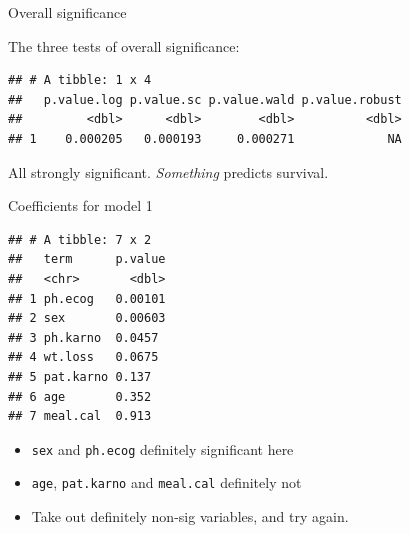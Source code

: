 \documentclass[
  ignorenonframetext,
]{beamer}
\newenvironment{Shaded}{\begin{snugshade}}{\end{snugshade}}
\newcommand{\FloatTok}[1]{\textcolor[rgb]{0.00,0.00,0.81}{#1}}
\newcommand{\KeywordTok}[1]{\textcolor[rgb]{0.13,0.29,0.53}{\textbf{#1}}}
\newcommand{\NormalTok}[1]{#1}
\newcommand{\OperatorTok}[1]{\textcolor[rgb]{0.81,0.36,0.00}{\textbf{#1}}}
\newcommand{\StringTok}[1]{\textcolor[rgb]{0.31,0.60,0.02}{#1}}
\begin{document}
\begin{frame}[fragile]{Overall significance}
\protect\hypertarget{overall-significance}{}

The three tests of overall significance: \small

\begin{Shaded}
\end{Shaded}

\begin{verbatim}
## # A tibble: 1 x 4
##   p.value.log p.value.sc p.value.wald p.value.robust
##         <dbl>      <dbl>        <dbl>          <dbl>
## 1    0.000205   0.000193     0.000271             NA
\end{verbatim}

\normalsize

All strongly significant. \emph{Something} predicts survival.

\end{frame}

\begin{frame}[fragile]{Coefficients for model 1}
\protect\hypertarget{coefficients-for-model-1}{}

\small

\begin{Shaded}
\end{Shaded}

\begin{verbatim}
## # A tibble: 7 x 2
##   term      p.value
##   <chr>       <dbl>
## 1 ph.ecog   0.00101
## 2 sex       0.00603
## 3 ph.karno  0.0457 
## 4 wt.loss   0.0675 
## 5 pat.karno 0.137  
## 6 age       0.352  
## 7 meal.cal  0.913
\end{verbatim}

\normalsize

\begin{itemize}
\item
  \texttt{sex} and \texttt{ph.ecog} definitely significant here
\item
  \texttt{age}, \texttt{pat.karno} and \texttt{meal.cal} definitely not
\item
  Take out definitely non-sig variables, and try again.
\end{itemize}

\end{frame}
\end{document}
